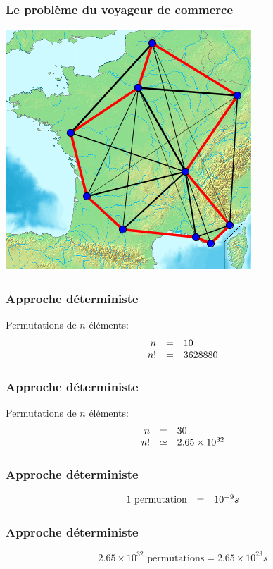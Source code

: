 \documentclass[16pt]{beamer}
\begin{document}
\begin{frame}
  \frametitle{Le problème du voyageur de commerce}
  \begin{center}
    \includegraphics[scale=0.7]{Carte_france_10_villes.png}
  \end{center}
\end{frame}

\begin{frame}
  \frametitle{Approche déterministe}
  Permutations de $n$ éléments:
  \[
  \begin{array}{r c l}
  n &=& 10 \\
  n! &=& 3 628 880
  \end{array}
  \]
\end{frame}

\begin{frame}
  \frametitle{Approche déterministe}
  Permutations de $n$ éléments:
  \[
  \begin{array}{r c l}
  n &=& 30 \\
  n! &\simeq& 2.65 \times 10^{32}
  \end{array}
  \]
\end{frame}

\begin{frame}
  \frametitle{Approche déterministe}
  \[
  \begin{array}{r c l}
     1\text{ permutation} &=& 10^{-9}s
  \end{array}
  \]
\end{frame}

\begin{frame}
  \frametitle{Approche déterministe}
  \[
  2.65 \times 10^{32} \text{ permutations} = 2.65 \times 10^{23}s
  \]
\end{frame}
\end{document}
